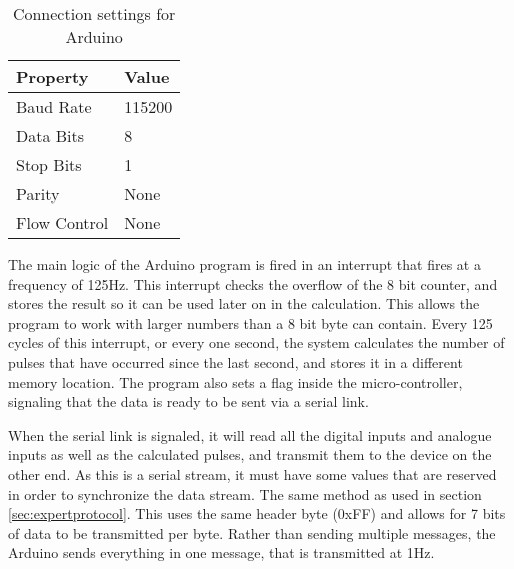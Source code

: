 \begin{table}
\begin{center}
    \begin{tabular}{|l|l|}
        \hline
        Property & Value \\ \hline
        Baud Rate    & 115200 \\
        Data Bits    & 8    \\ 
        Stop Bits    & 1    \\ 
        Parity       & None \\ 
        Flow Control & None \\
        \hline
    \end{tabular}
	\caption{Connection settings for Arduino}
\end{center}
\end{table}

The main logic of the Arduino program is fired in an interrupt that fires at a frequency of 125Hz. This interrupt checks the overflow of the 8 bit counter, and stores the result so it can be used later on in the calculation. This allows the program to work with larger numbers than a 8 bit byte can contain. Every 125 cycles of this interrupt, or every one second, the system calculates the number of pulses that have occurred since the last second, and stores it in a different memory location. The program also sets a flag inside the micro-controller, signaling that the data is ready to be sent via a serial link.

When the serial link is signaled, it will read all the digital inputs and analogue inputs as well as the calculated pulses, and transmit them to the device on the other end. As this is a serial stream, it must have some values that are reserved in order to synchronize the data stream. The same method as used in section \ref{sec:expertprotocol}. This uses the same header byte (0xFF) and allows for 7 bits of data to be transmitted per byte. Rather than sending multiple messages, the Arduino sends everything in one message, that is transmitted at 1Hz.

